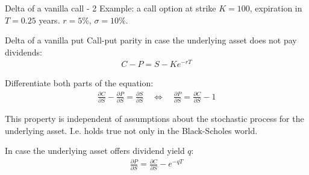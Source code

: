 \documentclass{beamer}
\begin{document}
\begin{frame}{Delta of a vanilla call - 2}
\justify
Example: a call option at strike $K=100$, expiration in $T=0.25$ years. $r=5\%$, $\sigma=10\%$.

\centering
{}
\end{frame}



\begin{frame}{Delta of a vanilla put}
\justify
Call-put parity in case the underlying asset does not pay dividends:
\begin{align*}
C - P = S - Ke^{-rT}
\end{align*}

\justify
Differentiate both parts of the equation:
\begin{align*}
\frac{\partial C}{\partial S} - \frac{\partial P}{\partial S} = \frac{\partial S}{\partial S} \quad \Leftrightarrow \quad \frac{\partial P}{\partial S} = \frac{\partial C}{\partial S} - 1
\end{align*}

\justify
This property is independent of assumptions about the stochastic process for the underlying asset. I.e. holds true not only in the Black-Scholes world.

\justify
In case the underlying asset offers dividend yield  $q$:
\begin{align*}
\frac{\partial P}{\partial S} = \frac{\partial C}{\partial S} - e^{-qT}
\end{align*}
\end{frame}
\end{document}
